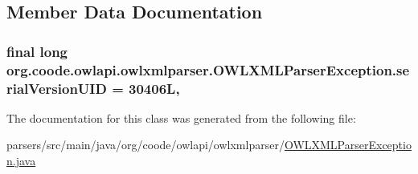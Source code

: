 \subsection{Member Data Documentation}
\hypertarget{classorg_1_1coode_1_1owlapi_1_1owlxmlparser_1_1_o_w_l_x_m_l_parser_exception_a36ae963b70e9c7b4ffe93be65b740458}{
\subsubsection[{serial\-Version\-U\-I\-D}]{\setlength{\rightskip}{0pt plus 5cm}final long org.\-coode.\-owlapi.\-owlxmlparser.\-O\-W\-L\-X\-M\-L\-Parser\-Exception.\-serial\-Version\-U\-I\-D = 30406\-L\hspace{0.3cm}{\ttfamily [static]}, {\ttfamily [private]}}}\label{classorg_1_1coode_1_1owlapi_1_1owlxmlparser_1_1_o_w_l_x_m_l_parser_exception_a36ae963b70e9c7b4ffe93be65b740458}


The documentation for this class was generated from the following file\-:\begin{DoxyCompactItemize}
\item 
parsers/src/main/java/org/coode/owlapi/owlxmlparser/\hyperlink{_o_w_l_x_m_l_parser_exception_8java}{O\-W\-L\-X\-M\-L\-Parser\-Exception.\-java}\end{DoxyCompactItemize}
